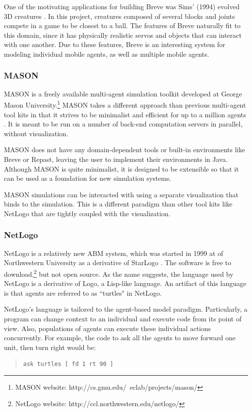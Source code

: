 One of the motivating applications for building Breve was Sims' (1994) evolved 3D creatures \cite{kleinbreve}.
In this project, creatures composed of several blocks and joints compete in a game to be closest to a ball.
The features of Breve naturally fit to this domain, since it has physically realistic servos and objects that can interact with one another.
Due to these features, Breve is an interesting system for modeling individual mobile agents, as well as multiple mobile agents.



\subsubsection{MASON}
MASON is a freely available multi-agent simulation toolkit developed at George Mason University.\footnote{MASON website: http://cs.gmu.edu/~eclab/projects/mason/}
MASON takes a different approach than previous multi-agent tool kits in that it strives to be minimalist and efficient for up to a million agents \cite{Luke}.
It is meant to be run on a number of back-end computation servers in parallel, without visualization.

MASON does not have any domain-dependent tools or built-in environments like Breve or Repast, leaving the user to implement their environments in Java.
Although MASON is quite minimalist, it is designed to be extensible so that it can be used as a foundation for new simulation systems.

MASON simulations can be interacted with using a separate visualization that binds to the simulation.
This is a different paradigm than other tool kits like NetLogo that are tightly coupled with the visualization.


\subsubsection{NetLogo}
NetLogo is a relatively new ABM system, which was started in 1999 at of Northwestern University as a derivative of StarLogo \cite{tisue2004netlogo}.
The software is free to download,\footnote{NetLogo website: http://ccl.northwestern.edu/netlogo/} but not open source.
As the name suggests, the language used by NetLogo is a derivative of Logo, a Lisp-like language.
An artifact of this language is that agents are referred to as ``turtles" in NetLogo.

NetLogo's language is tailored to the agent-based model paradigm.
Particularly, a program can change context to an individual and execute code from its point of view.
Also, populations of agents can execute these individual actions concurrently.
For example, the code to ask all the agents to move forward one unit, then turn right would be:
\begin{quote}\texttt{\small ask turtles [ fd 1 rt 90 ]}\end{quote}

